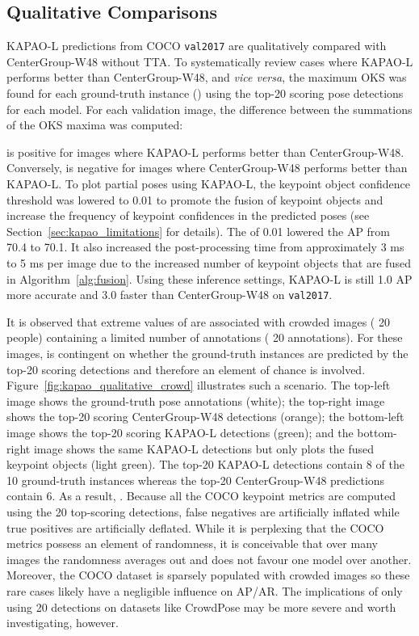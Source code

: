 \documentclass[runningheads]{llncs}
\begin{document}
\subsection{Qualitative Comparisons}
\label{sec:kapao_qualitative}
KAPAO-L predictions from COCO \texttt{val2017} are qualitatively compared with CenterGroup-W48 without TTA. To systematically review cases where KAPAO-L performs better than CenterGroup-W48, and \textit{vice versa}, the maximum OKS was found for each ground-truth instance () using the top-20 scoring pose detections for each model. For each validation image, the difference between the summations of the OKS maxima was computed:

 is positive for images where KAPAO-L performs better than CenterGroup-W48. Conversely,  is negative for images where CenterGroup-W48 performs better than KAPAO-L. To plot partial poses using KAPAO-L, the keypoint object confidence threshold  was lowered to 0.01 to promote the fusion of keypoint objects and increase the frequency of keypoint confidences in the predicted poses  (see Section~\ref{sec:kapao_limitations} for details). The  of 0.01 lowered the AP from 70.4 to 70.1. It also increased the post-processing time from approximately 3 ms to 5 ms per image due to the increased number of keypoint objects that are fused in Algorithm~\ref{alg:fusion}. Using these inference settings, KAPAO-L is still 1.0 AP more accurate and 3.0 faster than CenterGroup-W48 on \texttt{val2017}. 

It is observed that extreme values of  are associated with crowded images ( 20 people) containing a limited number of annotations ( 20 annotations). For these images,  is contingent on whether the ground-truth instances are predicted by the top-20 scoring detections and therefore an element of chance is involved. 
Figure~\ref{fig:kapao_qualitative_crowd} illustrates such a scenario. The top-left image shows the ground-truth pose annotations (white); the top-right image shows the top-20 scoring CenterGroup-W48 detections (orange); the bottom-left image shows the top-20 scoring KAPAO-L detections (green); and the bottom-right image shows the same KAPAO-L detections but only plots the fused keypoint objects (light green). The top-20 KAPAO-L detections contain 8 of the 10 ground-truth instances whereas the top-20 CenterGroup-W48 predictions contain 6. As a result, . Because all the COCO keypoint metrics are computed using the 20 top-scoring detections, false negatives are artificially inflated while true positives are artificially deflated. While it is perplexing that the COCO metrics possess an element of randomness, it is conceivable that over many images the randomness averages out and does not favour one model over another. Moreover, the COCO dataset is sparsely populated with crowded images so these rare cases likely have a negligible influence on AP/AR. The implications of only using 20 detections on datasets like CrowdPose may be more severe and worth investigating, however.
\end{document}
